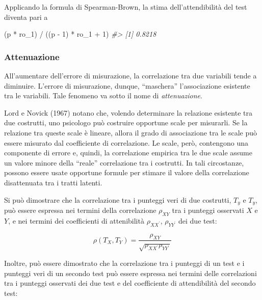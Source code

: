 \documentclass[
  11pt,
]{krantz}
\makeatletter
\newenvironment{Shaded}{\begin{snugshade}}{\end{snugshade}}
\newcommand{\CommentTok}[1]{\textcolor[rgb]{0.37,0.37,0.37}{\textit{#1}}}
\newcommand{\DecValTok}[1]{\textcolor[rgb]{0.06,0.06,0.06}{#1}}
\newcommand{\NormalTok}[1]{#1}
\newcommand{\SpecialCharTok}[1]{\textcolor[rgb]{0,0,0}{#1}}
\newenvironment{kframe}{%
\medskip{}
\setlength{\fboxsep}{.8em}
 \def\at@end@of@kframe{}%
 \ifinner\ifhmode%
  \def\at@end@of@kframe{\end{minipage}}%
  \begin{minipage}{\columnwidth}%
 \fi\fi%
 \def\FrameCommand##1{\hskip\@totalleftmargin \hskip-\fboxsep
 \colorbox{shadecolor}{##1}\hskip-\fboxsep
     \hskip-\linewidth \hskip-\@totalleftmargin \hskip\columnwidth}%
 \MakeFramed {\advance\hsize-\width
   \@totalleftmargin\z@ \linewidth\hsize
   \@setminipage}}%
 {\par\unskip\endMakeFramed%
 \at@end@of@kframe}
\renewenvironment{Shaded}{\begin{kframe}}{\end{kframe}}
\theoremstyle{definition}
\theoremstyle{definition}
\theoremstyle{definition}
\theoremstyle{definition}
\theoremstyle{remark}
\makeatother
\begin{document}
Applicando la formula di Spearman-Brown, la stima dell'attendibilità del test diventa pari a

\begin{Shaded}
\begin{Highlighting}[]
\NormalTok{(p }\SpecialCharTok{*}\NormalTok{ ro\_1) }\SpecialCharTok{/}\NormalTok{ ((p }\SpecialCharTok{{-}} \DecValTok{1}\NormalTok{) }\SpecialCharTok{*}\NormalTok{ ro\_1 }\SpecialCharTok{+} \DecValTok{1}\NormalTok{)}
\CommentTok{\#\textgreater{} [1] 0.8218}
\end{Highlighting}
\end{Shaded}

\hypertarget{attenuazione-1}{%
\subsubsection{Attenuazione}\label{attenuazione-1}}

All'aumentare dell'errore di misurazione, la correlazione tra due variabili tende a diminuire. L'errore di misurazione, dunque, ``maschera'' l'associazione esistente tra le variabili. Tale fenomeno va sotto il nome di \emph{attenuazione}.

Lord e Novick (1967) notano che, volendo determinare la relazione esistente tra due costrutti, uno psicologo può costruire opportune scale per misurarli. Se la relazione tra queste scale è lineare, allora il grado di associazione tra le scale può essere misurato dal coefficiente di correlazione. Le scale, però, contengono una componente di errore e, quindi, la correlazione empirica tra le due scale assume un valore minore della ``reale'' correlazione tra i costrutti. In tali circostanze, possono essere usate opportune formule per stimare il valore della correlazione disattenuata tra i tratti latenti.

Si può dimostrare che la correlazione tra i punteggi veri di due costrutti, \(T_y\) e \(T_y\), può essere espressa nei termini della correlazione \(\rho_{XY}\) tra i punteggi osservati \(X\) e \(Y\), e nei termini dei coefficienti di attenibilità \(\rho_{XX^\prime}\), \(\rho_{YY^\prime}\) dei due test:

\begin{equation}
\rho(T_X, T_Y)  = \frac{\rho_{XY}}{\sqrt{\rho_{XX^\prime} \rho_{YY^\prime}}}
\label{eq:3-9-6}
\end{equation}

Inoltre, può essere dimostrato che la correlazione tra i punteggi di un test e i punteggi veri di un secondo test può essere espressa nei termini delle correlazioni tra i punteggi osservati dei due test e del coefficiente di attendibilità del secondo test:
\end{document}

